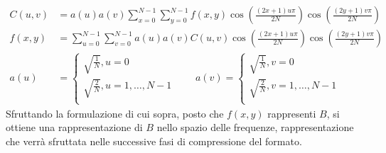 \documentclass{subfiles}
\begin{document}
\[\begin{aligned}
        C(u, v) & = a(u)a(v) \sum\limits_{x = 0}^{N - 1}\sum\limits_{y = 0}^{N - 1}{f(x, y) \cos\left(\frac{(2x + 1) u\pi}{2N}\right) \cos\left(\frac{(2y + 1) v\pi}{2N}\right)} \\
        f(x, y) & = \sum\limits_{u = 0}^{N - 1}\sum\limits_{v = 0}^{N - 1}{a(u)a(v) C(u, v) \cos\left(\frac{(2x + 1) u\pi}{2N}\right) \cos\left(\frac{(2y + 1) v\pi}{2N}\right)} \\
        a(u)    & = \begin{cases}
                        \sqrt{\frac{1}{N}}, u = 0                \\
                        \sqrt{\frac{2}{N}}, u = 1, \ldots, N - 1 \\
                    \end{cases} \qquad
        a(v) = \begin{cases}
                   \sqrt{\frac{1}{N}}, v = 0                \\
                   \sqrt{\frac{2}{N}}, v = 1, \ldots, N - 1 \\
               \end{cases}
    \end{aligned}\]
Sfruttando la formulazione di cui sopra, posto che \(f(x, y)\) rappresenti \(B\), si ottiene una rappresentazione di \(B\) nello spazio delle frequenze,
rappresentazione che verrà sfruttata nelle successive fasi di compressione del formato.
\end{document}
